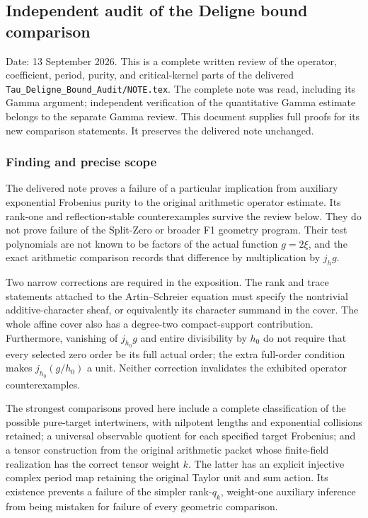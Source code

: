 \subsection{Independent audit of the Deligne bound comparison}\label{endpoint-purity_review--independent-audit-of-the-deligne-bound-comparison}

Date: 13 September 2026. This is a complete written review of the operator, coefficient, period, purity, and critical-kernel parts of the delivered \nolinkurl{Tau_Deligne_Bound_Audit/NOTE.tex}. The complete note was read, including its Gamma argument; independent verification of the quantitative Gamma estimate belongs to the separate Gamma review. This document supplies full proofs for its new comparison statements. It preserves the delivered note unchanged.

\subsubsection{Finding and precise scope}\label{endpoint-purity_review--finding-and-precise-scope}

The delivered note proves a failure of a particular implication from auxiliary exponential Frobenius purity to the original arithmetic operator estimate. Its rank-one and reflection-stable counterexamples survive the review below. They do not prove failure of the Split-Zero or broader F1 geometry program. Their test polynomials are not known to be factors of the actual function \(g=2\xi\), and the exact arithmetic comparison records that difference by multiplication by \(j_hg\).

Two narrow corrections are required in the exposition. The rank and trace statements attached to the Artin--Schreier equation must specify the nontrivial additive-character sheaf, or equivalently its character summand in the cover. The whole affine cover also has a degree-two compact-support contribution. Furthermore, vanishing of \(j_{h_0}g\) and entire divisibility by \(h_0\) do not require that every selected zero order be its full actual order; the extra full-order condition makes \(j_{h_0}(g/h_0)\) a unit. Neither correction invalidates the exhibited operator counterexamples.

The strongest comparisons proved here include a complete classification of the possible pure-target intertwiners, with nilpotent lengths and exponential collisions retained; a universal observable quotient for each specified target Frobenius; and a tensor construction from the original arithmetic packet whose finite-field realization has the correct tensor weight \(k\). The latter has an explicit injective complex period map retaining the original Taylor unit and sum action. Its existence prevents a failure of the simpler rank-\(q_k\), weight-one auxiliary inference from being mistaken for failure of every geometric comparison.

